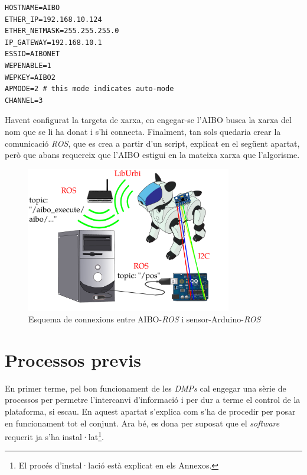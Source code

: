 \documentclass[12pt,a4paper,final,twoside]{report}
\begin{document}

\begin{verbatim}
HOSTNAME=AIBO
ETHER_IP=192.168.10.124
ETHER_NETMASK=255.255.255.0
IP_GATEWAY=192.168.10.1
ESSID=AIBONET
WEPENABLE=1
WEPKEY=AIBO2
APMODE=2 # this mode indicates auto-mode
CHANNEL=3
\end{verbatim}

Havent configurat la targeta de xarxa, en engegar-se l'AIBO busca la xarxa del nom que se li ha donat i s'hi connecta. Finalment, tan sols quedaria crear la comunicació \textit{ROS}, que es crea a partir d'un script, explicat en el següent apartat, però que abans requereix que l'AIBO estigui en la mateixa xarxa que l'algorisme.

\begin{figure}[tb]
\centering
\includegraphics[width=0.8\textwidth]{Imatges/esquema-comunicacio-ROS-Aibo-ordenadora.pdf}
\caption{Esquema de connexions entre AIBO-\textit{ROS} i sensor-Arduino-\textit{ROS}}
\label{fig:connexions-Aibo-ROS-sensor-Arduino-ROS}
\end{figure}



\section{Processos previs}


En primer terme, pel bon funcionament de les \textit{DMPs} cal engegar una sèrie de processos per permetre l'intercanvi d'informació i per dur a terme el control de la plataforma, si escau. En aquest apartat s'explica com s'ha de procedir per posar en funcionament tot el conjunt. Ara bé, es dona per suposat que el \textit{software} requerit ja s'ha instal·lat\footnote{El procés d'instal·lació està explicat en els Annexos.}.
\end{document}
